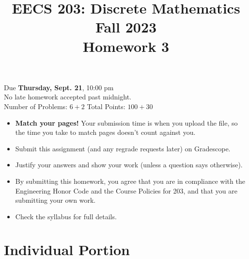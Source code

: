 \documentclass[12pt]{exam}
\begin{document}
\title{EECS 203: Discrete Mathematics\\
Fall 2023\\
Homework 3}
\date{}
\author{}
\maketitle
\vspace{-50pt}
\begin{center}
\huge Due \textbf{Thursday, Sept. 21}, 10:00 pm\\
\Large No late homework accepted past midnight.\\
\vspace{10pt}
\large Number of Problems: $6+2$
\hspace{3cm}
Total Points: $100+30$
\end{center}
\vspace{25pt}
\begin{itemize}
\item \textbf{Match your pages!} Your submission time is when you upload the
file, so the time you take to match pages doesn't count against you.
\item Submit this assignment (and any regrade requests later) on Gradescope.
\item Justify your answers and show your work (unless a question says
otherwise).
\item By submitting this homework, you agree that you are in compliance with
the Engineering Honor Code and the Course Policies for 203, and that you are
submitting your own work.
\item Check the syllabus for full details.
\end{itemize}
\newpage
\section*{Individual Portion}
\end{document}
